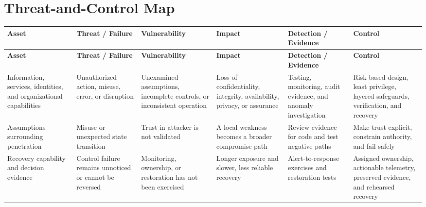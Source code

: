 \documentclass[11pt]{article}
\begin{document}
\section*{Threat-and-Control Map}
\begingroup\scriptsize\setlength{\tabcolsep}{2pt}
\begin{longtable}{>{\RaggedRight\arraybackslash}p{}>{\RaggedRight\arraybackslash}p{}>{\RaggedRight\arraybackslash}p{}>{\RaggedRight\arraybackslash}p{}>{\RaggedRight\arraybackslash}p{}>{\RaggedRight\arraybackslash}p{}}
\toprule\rowcolor{Navy}\color{white}\textbf{Asset} & \color{white}\textbf{Threat / Failure} & \color{white}\textbf{Vulnerability} & \color{white}\textbf{Impact} & \color{white}\textbf{Detection / Evidence} & \color{white}\textbf{Control}\\\midrule
\endfirsthead
\toprule\rowcolor{Navy}\color{white}\textbf{Asset} & \color{white}\textbf{Threat / Failure} & \color{white}\textbf{Vulnerability} & \color{white}\textbf{Impact} & \color{white}\textbf{Detection / Evidence} & \color{white}\textbf{Control}\\\midrule
\endhead
Information, services, identities, and organizational capabilities & Unauthorized action, misuse, error, or disruption & Unexamined assumptions, incomplete controls, or inconsistent operation & Loss of confidentiality, integrity, availability, privacy, or assurance & Testing, monitoring, audit evidence, and anomaly investigation & Risk-based design, least privilege, layered safeguards, verification, and recovery\\\midrule
Assumptions surrounding penetration & Misuse or unexpected state transition & Trust in attacker is not validated & A local weakness becomes a broader compromise path & Review evidence for code and test negative paths & Make trust explicit, constrain authority, and fail safely\\\midrule
Recovery capability and decision evidence & Control failure remains unnoticed or cannot be reversed & Monitoring, ownership, or restoration has not been exercised & Longer exposure and slower, less reliable recovery & Alert-to-response exercises and restoration tests & Assigned ownership, actionable telemetry, preserved evidence, and rehearsed recovery\\\midrule
\bottomrule
\end{longtable}
\endgroup
\end{document}
